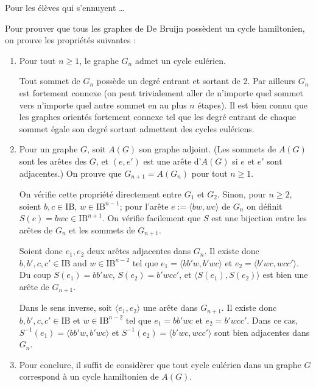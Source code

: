 \documentclass[11pt]{article}
\def\bool{\mathrm{I\!B}}
\def\tup#1{\langle{#1}\rangle}
\begin{document}
\begin{remarque}
Pour les élèves qui s'ennuyent \ldots
\end{remarque}

Pour prouver que tous les graphes de De Bruijn possèdent un cycle hamiltonien,
on prouve les propriétés suivantes :
\begin{enumerate}
\item Pour tout $n\ge1$, le graphe $G_n$ admet un cycle eulérien.
\begin{solution}
Tout sommet de $G_n$ possède un degré entrant et sortant de 2.
Par ailleurs $G_n$ est fortement connexe (on peut trivialement
aller de n'importe quel sommet vers n'importe quel autre sommet
en au plus $n$ étapes). Il est bien connu que les graphes orientés
fortement connexe tel que les degré entrant de chaque sommet
égale son degré sortant admettent des cycles eulériens.
\end{solution}

\item Pour un graphe $G$, soit $A(G)$ son graphe adjoint. (Les sommets
de $A(G)$ sont les arêtes des $G$, et $(e,e')$ est une arête d'$A(G)$
si $e$ et $e'$ sont adjacentes.) On prouve que $G_{n+1}=A(G_n)$ pour tout
$n\ge1$. 

\begin{solution}
On vérifie cette propriété directement entre $G_1$ et $G_2$. Sinon, pour
$n\ge2$, soient $b,c\in\bool$, $w\in \bool^{n-1}$;
pour l'arête $e:=\tup{bw,wc}$ de $G_n$ on définit $S(e)=bwc\in\bool^{n+1}$.
On vérifie facilement que $S$ est une bijection entre les arêtes de $G_n$
et les sommets de $G_{n+1}$.

Soient donc $e_1,e_2$ deux arêtes adjacentes dans $G_n$. Il existe donc
$b,b',c,c'\in\bool$ and $w\in\bool^{n-2}$ tel que
$e_1=\tup{bb'w,b'wc}$ et $e_2=\tup{b'wc,wcc'}$. Du coup
$S(e_1)=bb'wc$, $S(e_2)=b'wcc'$, et $\tup{S(e_1),S(e_2)}$ est bien une arête
de $G_{n+1}$.

Dans le sens inverse, soit $\tup{e_1,e_2}$ une arête dans $G_{n+1}$.
Il existe donc $b,b',c,c'\in\bool$ et $w\in\bool^{n-2}$ tel que
$e_1=bb'wc$ et $e_2=b'wcc'$. Dans ce cas, $S^{-1}(e_1)=\tup{bb'w,b'wc}$
et $S^{-1}(e_2)=\tup{b'wc,wcc'}$ sont bien adjacentes dans $G_n$.
\end{solution}

\item Pour conclure, il suffit de considèrer que tout cycle eulérien
  dans un graphe $G$ correspond à un cycle hamiltonien de $A(G)$.

\end{enumerate}
\end{document}
